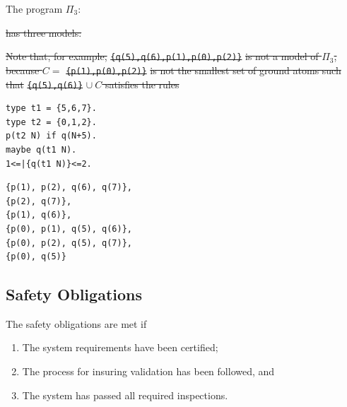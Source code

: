 \documentclass[a4paper,10pt]{article}
\providecommand{\DIFaddtex}[1]{{\protect\color{blue}\uwave{#1}}} %
\providecommand{\DIFdeltex}[1]{{\protect\color{red}\sout{#1}}}                      %
\providecommand{\DIFaddbegin}{} %
\providecommand{\DIFaddend}{} %
\providecommand{\DIFdelbegin}{} %
\providecommand{\DIFdelend}{} %
\providecommand{\DIFadd}[1]{\texorpdfstring{\DIFaddtex{#1}}{#1}} %
\providecommand{\DIFdel}[1]{\texorpdfstring{\DIFdeltex{#1}}{}} %
\begin{document}
\medskip\noindent
The program $\Pi_3$:
\DIFdelbegin %

\DIFdel{has three models:
}%

\DIFdel{Note that, for example, }\texttt{\DIFdel{\{q(5),q(6),p(1),p(0),p(2)\}}} %
\DIFdel{is not a model of $\Pi_3$, because $C =$ }\texttt{\DIFdel{\{p(1),p(0),p(2)\}}} %
\DIFdel{is not the smallest set of ground atoms such that }\texttt{\DIFdel{\{q(5),q(6)\}}} %
\DIFdel{$\cup~C$ satisfies the rules
}%
\DIFdelend \DIFaddbegin \begin{verbatim}
type t1 = {5,6,7}.
type t2 = {0,1,2}.
p(t2 N) if q(N+5).
maybe q(t1 N).
1<=|{q(t1 N)}<=2. 
\end{verbatim}
\DIFadd{has six models:
}\begin{verbatim}
{p(1), p(2), q(6), q(7)},
{p(2), q(7)},
{p(1), q(6)},
{p(0), p(1), q(5), q(6)},
{p(0), p(2), q(5), q(7)},
{p(0), q(5)}
\end{verbatim}
\DIFaddend 


\subsection{Safety Obligations}

The safety obligations are met if
\begin{enumerate}
 \item The system requirements have been certified;
 \item The process for insuring validation has been followed, and
  \item The system has passed all required inspections.
\end{enumerate}
\end{document}
